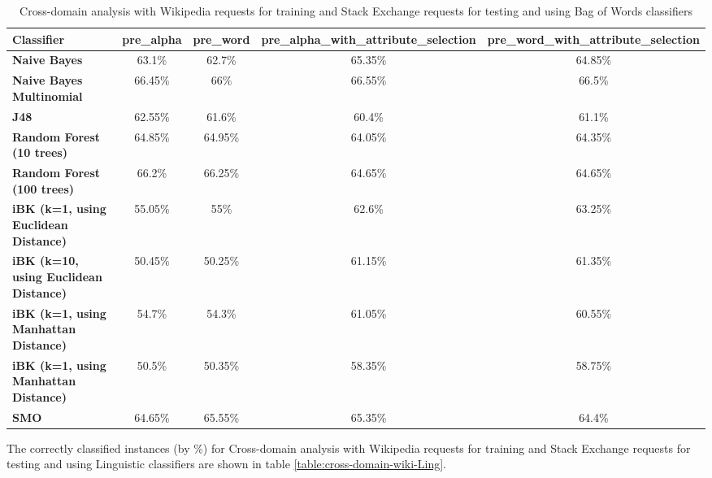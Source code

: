 \documentclass[conference]{IEEEtran}
\begin{document}
\begin{table*}[htbp]
\caption{Cross-domain analysis with Wikipedia requests for training and Stack Exchange requests for testing and using Bag of Words classifiers }
\centering
\vspace{5pt}
\begin{tabular}{|l|c|c|c|c|}
\hline
\textbf{Classifier} & \textbf{pre\_alpha} & \textbf{pre\_word} & \textbf{pre\_alpha\_with\_attribute\_selection} & \textbf{pre\_word\_with\_attribute\_selection} \\
\hline\hline
\textbf{Naive Bayes} & 63.1\% & 62.7\% & 65.35\% & 64.85\% \\ 
\hline
\textbf{Naive Bayes Multinomial} & 66.45\% & 66\% & 66.55\% & 66.5\% \\ 
\hline
\textbf{J48} & 62.55\% & 61.6\% & 60.4\% & 61.1\% \\ 
\hline
\textbf{Random Forest (10 trees)} & 64.85\% & 64.95\% & 64.05\% & 64.35\% \\ 
\hline
\textbf{Random Forest (100 trees)} & 66.2\% & 66.25\% & 64.65\% & 64.65\% \\ 
\hline
\textbf{iBK (k=1, using Euclidean Distance)} & 55.05\% & 55\% & 62.6\% & 63.25\% \\ 
\hline
\textbf{iBK (k=10, using Euclidean Distance)} & 50.45\% & 50.25\% & 61.15\% & 61.35\% \\ 
\hline
\textbf{iBK (k=1, using Manhattan Distance)} & 54.7\% & 54.3\% & 61.05\% & 60.55\% \\ 
\hline
\textbf{iBK (k=1, using Manhattan Distance)} & 50.5\% & 50.35\% & 58.35\% & 58.75\% \\ 
\hline
\textbf{SMO} & 64.65\% & 65.55\% & 65.35\% & 64.4\% \\ 
\hline
\hline
\end{tabular}
\label{table:cross-domain-wiki-BOW}
\end{table*}

The correctly classified instances (by \%) for Cross-domain analysis with Wikipedia requests for training and Stack Exchange requests for testing and using Linguistic classifiers are shown in table \ref{table:cross-domain-wiki-Ling}.
\end{document}
